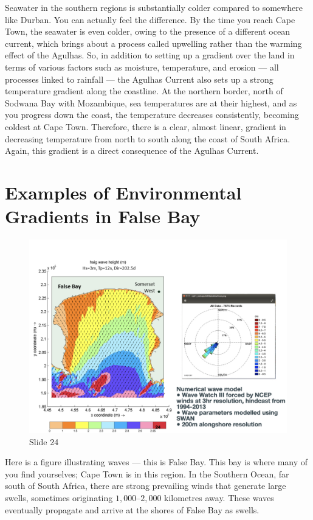 \documentclass[
  10pt,
]{book}
\begin{document}
Seawater in the southern regions is substantially colder compared to
somewhere like Durban. You can actually feel the difference. By the time
you reach Cape Town, the seawater is even colder, owing to the presence
of a different ocean current, which brings about a process called
upwelling rather than the warming effect of the Agulhas. So, in addition
to setting up a gradient over the land in terms of various factors such
as moisture, temperature, and erosion --- all processes linked to
rainfall --- the Agulhas Current also sets up a strong temperature
gradient along the coastline. At the northern border, north of Sodwana
Bay with Mozambique, sea temperatures are at their highest, and as you
progress down the coast, the temperature decreases consistently,
becoming coldest at Cape Town. Therefore, there is a clear, almost
linear, gradient in decreasing temperature from north to south along the
coast of South Africa. Again, this gradient is a direct consequence of
the Agulhas Current.

\section{Examples of Environmental Gradients in False
Bay}\label{examples-of-environmental-gradients-in-false-bay}

\begin{figure}[ht]
\centering
\includegraphics[width=0.8\linewidth]{../images/BDC334/BDC334-024.jpeg}
\caption*{Slide 24}
\end{figure}

Here is a figure illustrating waves --- this is False Bay. This bay is
where many of you find yourselves; Cape Town is in this region. In the
Southern Ocean, far south of South Africa, there are strong prevailing
winds that generate large swells, sometimes originating
\(1{,}000\)--\(2{,}000\) kilometres away. These waves eventually
propagate and arrive at the shores of False Bay as swells.
\end{document}
